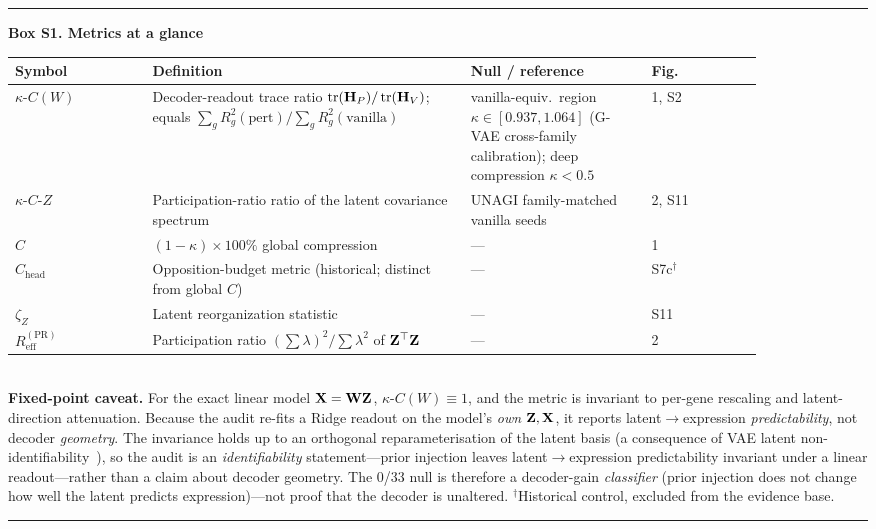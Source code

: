 \documentclass[11pt,a4paper]{article}
\newcommand{\Hmat}{\mathbf{H}}\newcommand{\Wmat}{\mathbf{W}}\newcommand{\Jmat}{\mathbf{J}}
\newenvironment{boxednote}[1]{%
  \par\medskip\noindent\begin{minipage}{\linewidth}%
    \hrule\smallskip\textbf{#1}\par\smallskip\small}{%
    \smallskip\hrule\end{minipage}\par\medskip}
\begin{document}
\begin{boxednote}{Box S1. Metrics at a glance}
\begin{tabular}{@{}p{0.16\linewidth}p{0.37\linewidth}p{0.21\linewidth}p{0.13\linewidth}@{}}
\toprule
Symbol & Definition & Null / reference & Fig. \\
\midrule
$\kappa$-$C(W)$ & Decoder-readout trace ratio $\trloss(\Hmat_P)/\trloss(\Hmat_V)$; equals $\sum_g R^2_g(\text{pert})/\sum_g R^2_g(\text{vanilla})$ & vanilla-equiv.\ region $\kappa\in[0.937,1.064]$ (G-VAE cross-family calibration); deep compression $\kappa<0.5$ & 1, S2 \\
$\kappa$-$C$-$Z$ & Participation-ratio ratio of the latent covariance spectrum & UNAGI family-matched vanilla seeds & 2, S11 \\
$C$ & $(1-\kappa)\times100\%$ global compression & --- & 1 \\
$C_{\text{head}}$ & Opposition-budget metric (historical; distinct from global $C$) & --- & S7c$^\dagger$ \\
$\zeta_Z$ & Latent reorganization statistic & --- & S11 \\
$R_{\text{eff}}^{(\text{PR})}$ & Participation ratio $(\sum\lambda)^2/\sum\lambda^2$ of $\mathbf{Z}^\top\mathbf{Z}$ & --- & 2 \\
\bottomrule
\end{tabular}\\[4pt]
\textbf{Fixed-point caveat.} For the exact linear model $\Xmat=\Wmat\Zmat$, $\kappa$-$C(W)\equiv1$, and the metric is invariant to per-gene rescaling and latent-direction attenuation. Because the audit re-fits a Ridge readout on the model's \emph{own} $\mathbf{Z},\mathbf{X}$, it reports latent$\to$expression \emph{predictability}, not decoder \emph{geometry}. The invariance holds up to an orthogonal reparameterisation of the latent basis (a consequence of VAE latent non-identifiability~\cite{khemakhem2020,locatello2019}), so the audit is an \emph{identifiability} statement---prior injection leaves latent$\to$expression predictability invariant under a linear readout---rather than a claim about decoder geometry. The 0/33 null is therefore a decoder-gain \emph{classifier} (prior injection does not change how well the latent predicts expression)---not proof that the decoder is unaltered. $^\dagger$Historical control, excluded from the evidence base.
\end{boxednote}
\end{document}
